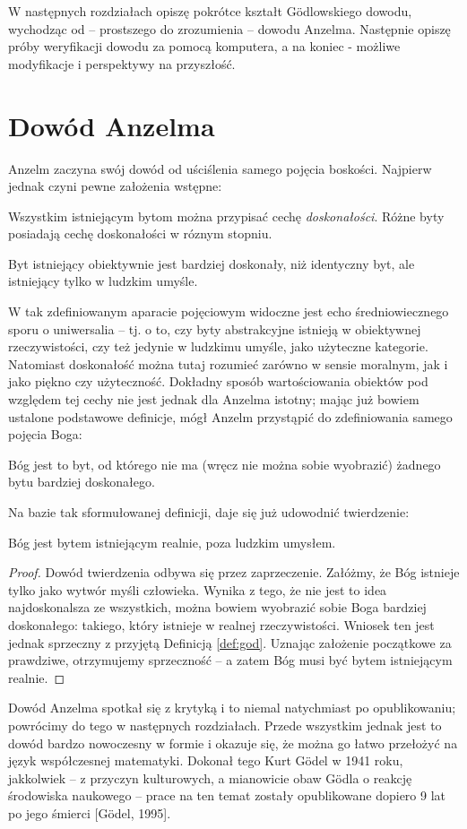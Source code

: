 \documentclass[12pt]{article}
\begin{document}
\begin{multicols}{2}
W następnych rozdziałach opiszę pokrótce kształt G\"odlowskiego dowodu, wychodząc od -- prostszego do zrozumienia -- dowodu Anzelma. Następnie opiszę próby weryfikacji dowodu za pomocą komputera, a na koniec - możliwe modyfikacje i perspektywy na przyszłość. 

\section{Dowód Anzelma}
Anzelm zaczyna swój dowód od uściślenia samego pojęcia boskości. Najpierw jednak czyni pewne założenia wstępne: 
\begin{axiom} \label{axiom:1}
	Wszystkim istniejącym bytom można przypisać cechę \emph{doskonałości}. Różne byty posiadają cechę doskonałości w róznym stopniu. 
\end{axiom}
\begin{axiom} \label{axiom:2}
	Byt istniejący obiektywnie jest bardziej doskonały, niż identyczny byt, ale istniejący tylko w ludzkim umyśle. 
\end{axiom}
W tak zdefiniowanym aparacie pojęciowym widoczne jest echo średniowiecznego sporu o uniwersalia -- tj. o to, czy byty abstrakcyjne istnieją w obiektywnej rzeczywistości, czy też jedynie w ludzkimu umyśle, jako użyteczne kategorie. Natomiast doskonałość można tutaj rozumieć zarówno w sensie moralnym, jak i jako piękno czy użyteczność. Dokładny sposób wartościowania obiektów pod względem tej cechy nie jest jednak dla Anzelma istotny; mając już bowiem ustalone podstawowe definicje, mógł Anzelm przystąpić do zdefiniowania samego pojęcia Boga:
\begin{definition} \label{def:god}
	Bóg jest to byt, od którego nie ma (wręcz nie można sobie wyobrazić) żadnego bytu bardziej doskonałego. 
\end{definition}
Na bazie tak sformułowanej definicji, daje się już udowodnić twierdzenie:
\begin{theorem} \label{theorem:god}
	Bóg jest bytem istniejącym realnie, poza ludzkim umysłem. 
\end{theorem}
\begin{proof}
	Dowód twierdzenia odbywa się przez zaprzeczenie. Załóżmy, że Bóg istnieje tylko jako wytwór myśli człowieka. Wynika z tego, że nie jest to idea najdoskonalsza ze wszystkich, można bowiem wyobrazić sobie Boga bardziej doskonałego: takiego, który istnieje w realnej rzeczywistości. Wniosek ten jest jednak sprzeczny z przyjętą Definicją \ref{def:god}. Uznając założenie początkowe za prawdziwe, otrzymujemy sprzeczność -- a zatem Bóg musi być bytem istniejącym realnie. 
\end{proof}
Dowód Anzelma spotkał się z krytyką i to niemal natychmiast po opublikowaniu; powrócimy do tego w następnych rozdziałach. Przede wszystkim jednak jest to dowód bardzo nowoczesny w formie i okazuje się, że można go łatwo przełożyć na język współczesnej matematyki. Dokonał tego Kurt G\"odel w 1941 roku, jakkolwiek -- z przyczyn kulturowych, a mianowicie obaw G\"odla o reakcję środowiska naukowego -- prace na ten temat zostały opublikowane dopiero 9 lat po jego śmierci [G\"odel, 1995]. 


\end{multicols}
\end{document}

